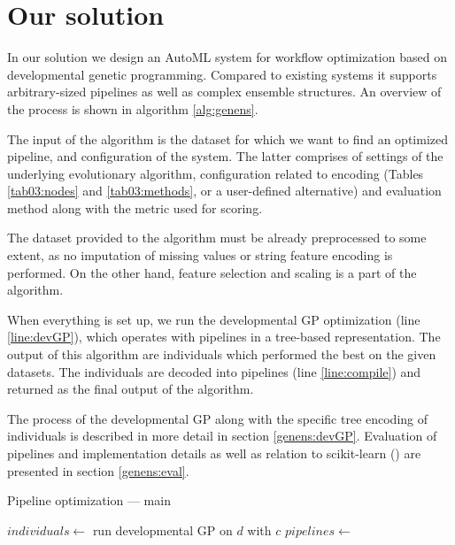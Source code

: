 \chapter{Our solution} \label{our:solution}

In our solution we design an AutoML system for workflow optimization based on
developmental genetic programming. Compared to existing systems it supports 
arbitrary-sized pipelines as well as complex ensemble structures. An overview
of the process is shown in algorithm \ref{alg:genens}.

The input of the
algorithm is the dataset for which we want to find an optimized pipeline, and
configuration of the system. The latter comprises of settings of the
underlying evolutionary algorithm, configuration related to encoding (Tables
\ref{tab03:nodes} and \ref{tab03:methods}, or a user-defined alternative) and
evaluation method along with the metric used for scoring.

The dataset provided to the algorithm must be already preprocessed to some
extent, as no imputation of missing values or string feature encoding is
performed. On the other hand, feature selection and scaling is a part of
the algorithm.

When everything is set up, we run the developmental GP optimization
(line \ref{line:devGP}), which operates with pipelines in a tree-based
representation. The output of this algorithm are individuals which
performed the best on the given datasets. The individuals are decoded into
pipelines (line \ref{line:compile}) and returned as the final output of the
algorithm.

The process of the developmental GP along with the specific tree encoding of
individuals is described in more detail in section \ref{genens:devGP}. 
Evaluation of pipelines and implementation details as well as relation to
scikit-learn (\cite{scikit-learn}) are presented in section \ref{genens:eval}.

\begin{algorithm}
\DontPrintSemicolon 
\caption{Pipeline optimization --- main\label{alg:genens}}
  \;
  $individuals \longleftarrow$ run developmental GP on $d$ with $c$ \label{line:devGP} \;
  $pipelines \longleftarrow$  \label{line:compile}
  \;\;
  
\end{algorithm}


